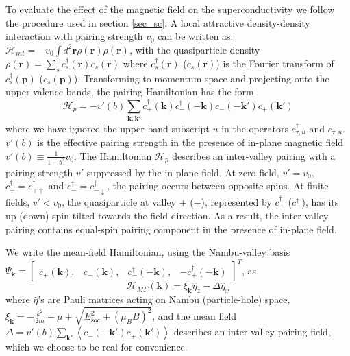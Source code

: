 To evaluate the effect of the magnetic field on the superconductivity we follow the procedure used in section  \ref{sec_sc}. A local attractive density-density
interaction with pairing strength $v_{0}$ can be written as: $\mathcal{H}_{int}=-v_{0}\int d^{2}\mathbf{r}\rho(\mathbf{r})\rho(\mathbf{r})$,
with the quasiparticle density $\rho(\mathbf{r})=\sum_{s}c_{s}^{\dagger}(\mathbf{r})c_{s}(\mathbf{r})$
where $c_{s}^{\dagger}(\mathbf{r})$ ($c_{s}(\mathbf{r})$) is the
Fourier transform of $c_{s}^{\dagger}(\mathbf{p})$ ($c_{s}(\mathbf{p})$).
Transforming to momentum space and projecting onto the upper valence
bands, the pairing Hamiltonian has the form
\begin{equation}
\mathcal{H}_{p}=-v'(b)\sum_{\mathbf{k},\mathbf{k}'}c_{+}^{\dagger}(\mathbf{k})c_{-}^{\dagger}(-\mathbf{k})c_{-}(-\mathbf{k}')c_{+}(\mathbf{k}')\label{eq: pairing_Hamiltonian}
\end{equation}
where we have ignored the upper-band subscript $u$ in the operators
$c_{\tau,u}^{\dagger}$ and $c_{\tau,u}$. $v'(b)$ is the effective
pairing strength in the presence of in-plane magnetic field $v'(b)\equiv\frac{1}{1+b^{2}}v_{0}$.
The Hamiltonian $\mathcal{H}_{p}$ describes an inter-valley pairing
with a pairing strength $v'$ suppressed by the in-plane field. At
zero field, $v'=v_{0}$, $c_{+}^{\dagger}=c_{+\uparrow}^{\dagger}$ and
$c_{-}^{\dagger}=c_{-\downarrow}^{\dagger}$, the pairing occurs between
opposite spins. At finite fields, $v'<v_{0}$, the quasiparticle at valley
$+$ ($-$), represented by $c_{+}^{\dagger}$ ($c_{-}^{\dagger}$),
has its up (down) spin tilted towards the field direction. As a result,
the inter-valley pairing contains equal-spin pairing component in
the presence of in-plane field.

We write the mean-field Hamiltonian, using the Nambu-valley basis
$\Psi_{\mathbf{k}}=\left[\begin{array}{cccc}
c_{+}(\mathbf{k}), & c_{-}(\mathbf{k}), & c_{-}^{\dagger}(-\mathbf{k}), & -c_{+}^{\dagger}(-\mathbf{k})\end{array}\right]^{T}$, as
\begin{equation}
\mathcal{H}_{MF}(\mathbf{k})=\xi_{\mathbf{k}}\hat{\eta}_{z}-\Delta\hat{\eta}_{x}\label{eq: Mean_Field_Hamiltonian}
\end{equation}
where $\hat{\eta}$'s are Pauli matrices acting on Nambu (particle-hole)
space, $\xi_{\mathbf{k}}=-\frac{k^{2}}{2m}-\mu+\sqrt{E_{\text{soc}}^{2}+\left(\mu_{B}B\right)^{2}}$,
and the mean field $\Delta=v'(b)\sum_{\mathbf{k}'}\left\langle c_{-}(-\mathbf{k}')c_{+}(\mathbf{k}')\right\rangle $
describes an inter-valley pairing field, which we choose to be real
for convenience.

